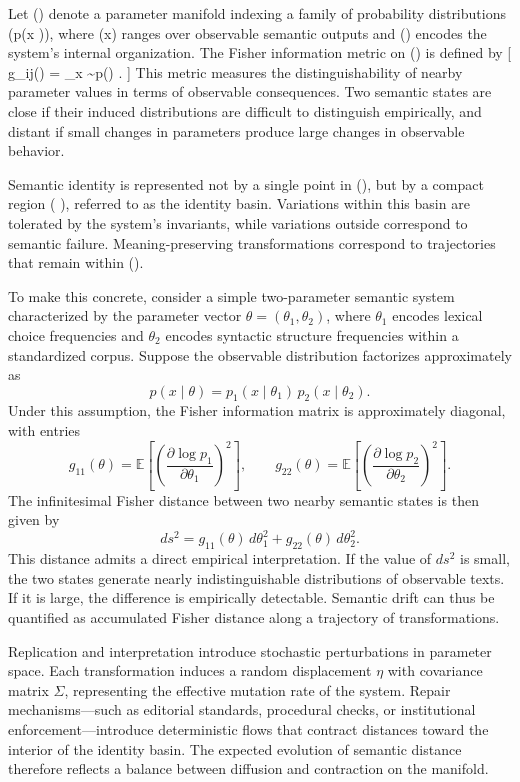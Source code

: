 \documentclass[11pt,oneside]{article}
\begin{document}
Let (\Theta) denote a parameter manifold indexing a family of probability distributions (p(x \mid \theta)), where (x) ranges over observable semantic outputs and (\theta \in \Theta) encodes the system’s internal organization. The Fisher information metric on (\Theta) is defined by
[
g_{ij}(\theta) =
_{x \sim p(\cdot \mid \theta)}
.
]
This metric measures the distinguishability of nearby parameter values in terms of observable consequences. Two semantic states are close if their induced distributions are difficult to distinguish empirically, and distant if small changes in parameters produce large changes in observable behavior.

Semantic identity is represented not by a single point in (\Theta), but by a compact region ( \subset \Theta), referred to as the identity basin. Variations within this basin are tolerated by the system’s invariants, while variations outside correspond to semantic failure. Meaning-preserving transformations correspond to trajectories that remain within ().

To make this concrete, consider a simple two-parameter semantic system characterized by the parameter vector $\theta = (\theta_1, \theta_2)$, where $\theta_1$ encodes lexical choice frequencies and $\theta_2$ encodes syntactic structure frequencies within a standardized corpus. Suppose the observable distribution factorizes approximately as
\[
p(x \mid \theta) = p_1(x \mid \theta_1)\, p_2(x \mid \theta_2).
\]
Under this assumption, the Fisher information matrix is approximately diagonal, with entries
\[
g_{11}(\theta)
=
\mathbb{E}
\left[
\left(
\frac{\partial \log p_1}{\partial \theta_1}
\right)^2
\right],
\qquad
g_{22}(\theta)
=
\mathbb{E}
\left[
\left(
\frac{\partial \log p_2}{\partial \theta_2}
\right)^2
\right].
\]
The infinitesimal Fisher distance between two nearby semantic states is then given by
\[
ds^2
=
g_{11}(\theta)\, d\theta_1^2
+
g_{22}(\theta)\, d\theta_2^2 .
\]
This distance admits a direct empirical interpretation. If the value of $ds^2$ is small, the two states generate nearly indistinguishable distributions of observable texts. If it is large, the difference is empirically detectable. Semantic drift can thus be quantified as accumulated Fisher distance along a trajectory of transformations.

Replication and interpretation introduce stochastic perturbations in parameter space. Each transformation induces a random displacement $\eta$ with covariance matrix $\Sigma$, representing the effective mutation rate of the system. Repair mechanisms—such as editorial standards, procedural checks, or institutional enforcement—introduce deterministic flows that contract distances toward the interior of the identity basin. The expected evolution of semantic distance therefore reflects a balance between diffusion and contraction on the manifold.
\end{document}
